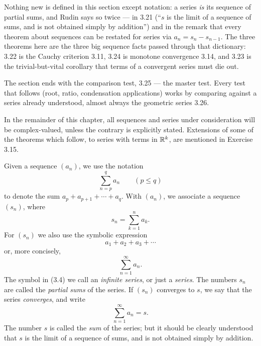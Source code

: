 
\begin{signpost}
Nothing new is defined in this section except notation: a series \emph{is} its
sequence of partial sums, and Rudin says so twice --- in 3.21 (``$s$ is the
limit of a sequence of sums, and is not obtained simply by addition'') and in
the remark that every theorem about sequences can be restated for series via
$a_n = s_n - s_{n-1}$. The three theorems here are the three big sequence facts
passed through that dictionary: 3.22 is the Cauchy criterion 3.11, 3.24 is
monotone convergence 3.14, and 3.23 is the trivial-but-vital corollary that
terms of a convergent series must die out.

\smallskip
The section ends with the comparison test, 3.25 --- the master test. Every
test that follows (root, ratio, condensation applications) works by comparing
against a series already understood, almost always the geometric series 3.26.
\end{signpost}

\noindent
In the remainder of this chapter, all sequences and series under consideration
will be complex-valued, unless the contrary is explicitly stated. Extensions of
some of the theorems which follow, to series with terms in $\mathbb{R}^k$, are
mentioned in Exercise 3.15.

Given a sequence $(a_n)$, we use the notation
\[ \sum_{n=p}^{q} a_n \qquad (p \le q) \]
to denote the sum $a_p + a_{p+1} + \cdots + a_q$. With $(a_n)$, we associate a
sequence $(s_n)$, where
\[ s_n = \sum_{k=1}^{n} a_k. \]
For $(s_n)$ we also use the symbolic expression
\[ a_1 + a_2 + a_3 + \cdots \]
or, more concisely,
\begin{equation}
  \sum_{n=1}^{\infty} a_n. \tag{3.4}
\end{equation}
The symbol in (3.4) we call an \emph{infinite series}, or just a \emph{series}.
The numbers $s_n$ are called the \emph{partial sums} of the series. If $(s_n)$
converges to $s$, we say that the series \emph{converges}, and write
\[ \sum_{n=1}^{\infty} a_n = s. \]
The number $s$ is called the \emph{sum} of the series; but it should be clearly
understood that $s$ is the limit of a sequence of sums, and is not obtained
simply by addition.

